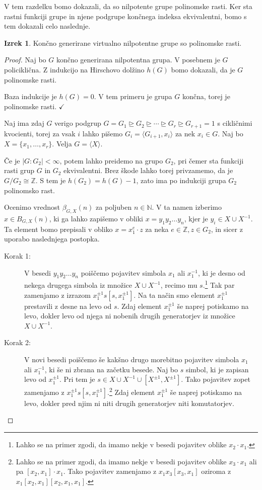 \documentclass[11pt]{book}
\def\NN{\mathbb{N}}
\def\ZZ{\mathbb{Z}}
\def\kljuka{$\checkmark$}
\theoremstyle{definition}
\theoremstyle{zgled}
\theoremstyle{odprtproblem}
\theoremstyle{domacanaloga}
\newenvironment{dokaz}
    {\color{siva}\begin{proof}}
    {\end{proof}}
\theoremstyle{izrek}
\newtheorem*{izrek}{Izrek}
\begin{document}
V tem razdelku bomo dokazali, da so nilpotente grupe polinomske rasti. Ker sta rastni funkciji grupe in njene podgrupe končnega indeksa ekvivalentni, bomo s tem dokazali celo naslednje.

\begin{izrek}
Končno generirane virtualno nilpotentne grupe so polinomske rasti.
\end{izrek}

\begin{dokaz}
Naj bo $G$ končno generirana nilpotentna grupa. V posebnem je $G$ policiklična. Z indukcijo na Hirschovo dolžino $h(G)$ bomo dokazali, da je $G$ polinomske rasti.

Baza indukcije je $h(G) = 0$. V tem primeru je grupa $G$ končna, torej je polinomske rasti. \kljuka

Naj ima zdaj $G$ verigo podgrup $G = G_1 \unrhd G_2 \unrhd \cdots \unrhd G_r \unrhd G_{r+1} = 1$ s cikličnimi kvocienti, torej za vsak $i$ lahko pišemo $G_i = \langle G_{i+1}, x_i \rangle$ za nek $x_i \in G$. Naj bo $X = \{ x_1, \dots, x_r \}$. Velja $G = \langle X \rangle$. 

Če je $|G : G_2| < \infty$, potem lahko preidemo na grupo $G_2$, pri čemer sta funkciji rasti grup $G$ in $G_2$ ekvivalentni. Brez škode lahko torej privzamemo, da je $G/G_2 \cong \ZZ$. S tem je $h(G_2) = h(G) - 1$, zato ima po indukciji grupa $G_2$ polinomsko rast.

Ocenimo vrednost $\beta_{G,X}(n)$ za poljuben $n \in \NN$. V ta namen izberimo $x \in B_{G,X}(n)$, ki ga lahko zapišemo v obliki $x = y_1 y_2 \dots y_n$, kjer je $y_i \in X \cup X^{-1}$. Ta element bomo prepisali v obliko $x = x_1^e \cdot z$ za neka $e \in \ZZ, z \in G_2$, in sicer z uporabo naslednjega postopka.

\begin{description}
    \item[Korak 1:] V besedi $y_1 y_2 \dots y_n$ poiščemo pojavitev simbola $x_1$ ali $x_1^{-1}$, ki je desno od nekega drugega simbola iz množice $X \cup X^{-1}$, recimo mu $s$.\footnote{Lahko se na primer zgodi, da imamo nekje v besedi pojavitev oblike $x_2 \cdot x_1$.} Tak par zamenjamo z izrazom $x_1^{\pm 1} s [s, x_1^{\pm 1}]$. Na ta način smo element $x_1^{\pm 1}$ prestavili z desne na levo od $s$. Zdaj element $x_1^{\pm 1}$ še naprej potiskamo na levo, dokler levo od njega ni nobenih drugih generatorjev iz množice $X \cup X^{-1}$.

    \item[Korak 2:] V novi besedi poiščemo še kakšno drugo morebitno pojavitev simbola $x_1$ ali $x_1^{-1}$, ki še ni zbrana na začetku besede. Naj bo $s$ simbol, ki je zapisan levo od $x_1^{\pm 1}$. Pri tem je $s \in X \cup X^{-1} \cup [X^{\pm 1},X^{\pm 1}]$. Tako pojavitev zopet zamenjamo z $x_1^{\pm 1} s [s, x_1^{\pm 1}]$.\footnote{Lahko se na primer zgodi, da imamo nekje v besedi pojavitev oblike $x_3 \cdot x_1$ ali pa $[x_2, x_1] \cdot x_1$. Tako pojavitev zamenjamo z $x_1 x_3 [x_3, x_1]$ oziroma z $x_1 [x_2, x_1] [x_2, x_1, x_1]$.} Zdaj element $x_1^{\pm 1}$ še naprej potiskamo na levo, dokler pred njim ni niti drugih generatorjev niti komutatorjev.


\end{description}
\end{dokaz}
\end{document}

